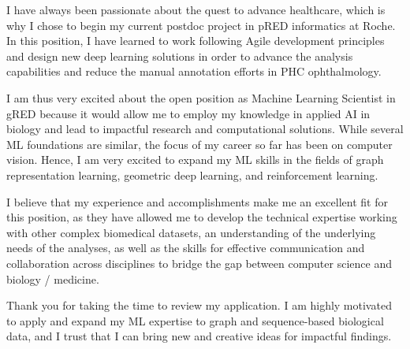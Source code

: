 \documentclass[10pt, letter]{ag-cv} %
\begin{document}
\begin{cvletter}
\begin{flushleft}
I have always been passionate about the quest to advance healthcare, which is why I chose to begin my current postdoc project in pRED informatics at Roche. In this position, I have learned to work following Agile development principles and design new deep learning solutions in order to advance the analysis capabilities and reduce the manual annotation efforts in PHC ophthalmology. 

I am thus very excited about the open position as Machine Learning Scientist in gRED because it would allow me to employ my knowledge in applied AI in biology and lead to impactful research and computational solutions. While several ML foundations are similar, the focus of my career so far has been on computer vision. Hence, I am very excited to expand my ML skills in the fields of graph representation learning, geometric deep learning, and reinforcement learning.  

I believe that my experience and accomplishments make me an excellent fit for this position, as they have allowed me to develop the technical expertise working with other complex biomedical datasets, an understanding of the underlying needs of the analyses, as well as the skills for effective communication and collaboration across disciplines to bridge the gap between computer science and biology / medicine. 

Thank you for taking the time to review my application. I am highly motivated to apply and expand my ML expertise to graph and sequence-based biological data, and I trust that I can bring new and creative ideas for impactful findings.

\end{flushleft}

\end{cvletter}


\makeletterclosing %
\end{document}
